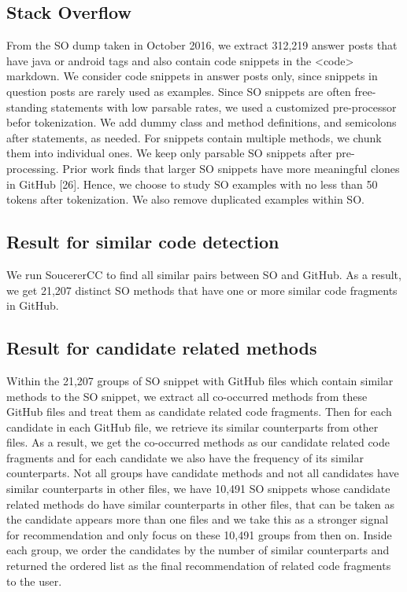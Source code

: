 \subsection{Stack Overflow}
From the SO dump taken in October 2016, we extract 312,219 answer posts that have java or android tags and also contain code snippets in the {\ttt <code>} markdown. We consider code snippets in answer posts only, since snippets in question posts are rarely used as examples. Since SO snippets are often free-standing statements with low parsable rates, we used a customized pre-processor befor tokenization. We add dummy class and method definitions, and semicolons after statements, as needed. For snippets contain multiple methods, we chunk them into individual ones. We keep only parsable SO snippets after pre-processing. Prior work finds that larger SO snippets have more meaningful clones in GitHub [26]. Hence, we choose to study SO examples with no less than 50 tokens after tokenization. We also remove duplicated examples within SO.

\subsection{Result for similar code detection}
We run SoucererCC to find all similar pairs between SO and GitHub. As a result, we get 21,207 distinct SO methods that have one or more similar code fragments in GitHub. 

\subsection{Result for candidate related methods}
Within the 21,207 groups of SO snippet with GitHub files which contain similar methods to the SO snippet, we extract all co-occurred methods from these GitHub files and treat them as candidate related code fragments. Then for each candidate in each GitHub file, we retrieve its similar counterparts from other files. As a result, we get the co-occurred methods as our candidate related code fragments and for each candidate we also have the frequency of its similar counterparts. Not all groups have candidate methods and not all candidates have similar counterparts in other files, we have 10,491 SO snippets whose candidate related methods do have similar counterparts in other files, that can be taken as the candidate appears more than one files and we take this as a stronger signal for recommendation and only focus on these 10,491 groups from then on. Inside each group, we order the candidates by the number of similar counterparts and returned the ordered list as the final recommendation of related code fragments to the user. 

